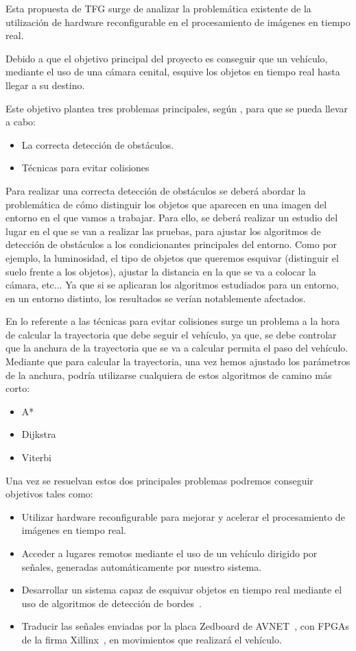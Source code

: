 \documentclass{pre-tfg}
\begin{document}
Esta propuesta de TFG surge de analizar la problemática existente de la utilización de hardware reconfigurable en el procesamiento de imágenes en tiempo real.

Debido a que el objetivo principal del proyecto es conseguir que un vehículo, mediante el uso de una cámara cenital, esquive los objetos en tiempo real hasta llegar a su destino. 

Este objetivo plantea tres problemas principales, según \cite{Problemas}, para que se pueda llevar a cabo:

\begin{itemize}
\item La correcta detección de obstáculos.
\item Técnicas para evitar colisiones 
\end{itemize}

Para realizar una correcta detección de obstáculos se deberá abordar la problemática de cómo distinguir los objetos que aparecen en una imagen del entorno en el que vamos a trabajar. Para ello, se deberá realizar un estudio del lugar en el que se van a realizar las pruebas, para ajustar los algoritmos de detección de obstáculos a los condicionantes principales del entorno. Como por ejemplo, la luminosidad, el tipo de objetos que queremos esquivar (distinguir el suelo frente a los objetos), ajustar la distancia en la que se va a colocar la cámara, etc... Ya que si se aplicaran los algoritmos estudiados para un entorno, en un entorno distinto, los resultados se verían notablemente afectados.

En lo referente a las técnicas para evitar colisiones surge un problema a la hora de calcular la trayectoria que debe seguir el vehículo, ya que, se debe controlar que la anchura de la trayectoria que se va a calcular permita el paso del vehículo. Mediante que para calcular la trayectoria, una vez hemos ajustado los parámetros de la anchura, podría utilizarse cualquiera de estos algoritmos de camino más corto:

\begin{itemize}
\item A*
\item Dijkstra
\item Viterbi
\end{itemize} 

Una vez se resuelvan estos dos principales problemas podremos conseguir objetivos tales como:

\begin{itemize}
\item Utilizar hardware reconfigurable para mejorar y acelerar el procesamiento de imágenes en tiempo real.
\item Acceder a lugares remotos mediante el uso de un vehículo dirigido por señales, generadas automáticamente por nuestro sistema. 
\item Desarrollar un sistema capaz de esquivar objetos en tiempo real mediante el uso de algoritmos de detección de bordes~\cite{Edges}.
\item Traducir las señales enviadas por la placa Zedboard de AVNET~\cite{Zedboard}, con FPGAs de la firma Xillinx~\cite{Fpga}, en movimientos que realizará el vehículo.
\end{itemize}
\end{document}
